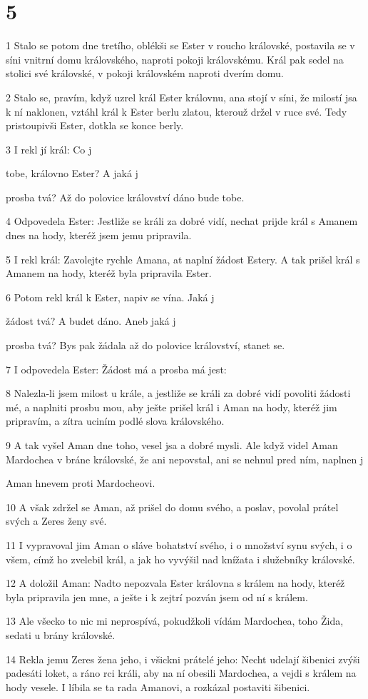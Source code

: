 \chapter{5}

\par 1 Stalo se potom dne tretího, oblékši se Ester v roucho královské, postavila se v síni vnitrní domu královského, naproti pokoji královskému. Král pak sedel na stolici své královské, v pokoji královském naproti dverím domu.
\par 2 Stalo se, pravím, když uzrel král Ester královnu, ana stojí v síni, že milostí jsa k ní naklonen, vztáhl král k Ester berlu zlatou, kterouž držel v ruce své. Tedy pristoupivši Ester, dotkla se konce berly.
\par 3 I rekl jí král: Co j\par tobe, královno Ester? A jaká j\par prosba tvá? Až do polovice království dáno bude tobe.
\par 4 Odpovedela Ester: Jestliže se králi za dobré vidí, nechat prijde král s Amanem dnes na hody, kteréž jsem jemu pripravila.
\par 5 I rekl král: Zavolejte rychle Amana, at naplní žádost Estery. A tak prišel král s Amanem na hody, kteréž byla pripravila Ester.
\par 6 Potom rekl král k Ester, napiv se vína. Jaká j\par žádost tvá? A budet dáno. Aneb jaká j\par prosba tvá? Bys pak žádala až do polovice království, stanet se.
\par 7 I odpovedela Ester: Žádost má a prosba má jest:
\par 8 Nalezla-li jsem milost u krále, a jestliže se králi za dobré vidí povoliti žádosti mé, a naplniti prosbu mou, aby ješte prišel král i Aman na hody, kteréž jim pripravím, a zítra uciním podlé slova královského.
\par 9 A tak vyšel Aman dne toho, vesel jsa a dobré mysli. Ale když videl Aman Mardochea v bráne královské, že ani nepovstal, ani se nehnul pred ním, naplnen j\par Aman hnevem proti Mardocheovi.
\par 10 A však zdržel se Aman, až prišel do domu svého, a poslav, povolal prátel svých a Zeres ženy své.
\par 11 I vypravoval jim Aman o sláve bohatství svého, i o množství synu svých, i o všem, címž ho zvelebil král, a jak ho vyvýšil nad knížata i služebníky královské.
\par 12 A doložil Aman: Nadto nepozvala Ester královna s králem na hody, kteréž byla pripravila jen mne, a ješte i k zejtrí pozván jsem od ní s králem.
\par 13 Ale všecko to nic mi neprospívá, pokudžkoli vídám Mardochea, toho Žida, sedati u brány královské.
\par 14 Rekla jemu Zeres žena jeho, i všickni prátelé jeho: Necht udelají šibenici zvýši padesáti loket, a ráno rci králi, aby na ní obesili Mardochea, a vejdi s králem na hody vesele. I líbila se ta rada Amanovi, a rozkázal postaviti šibenici.

